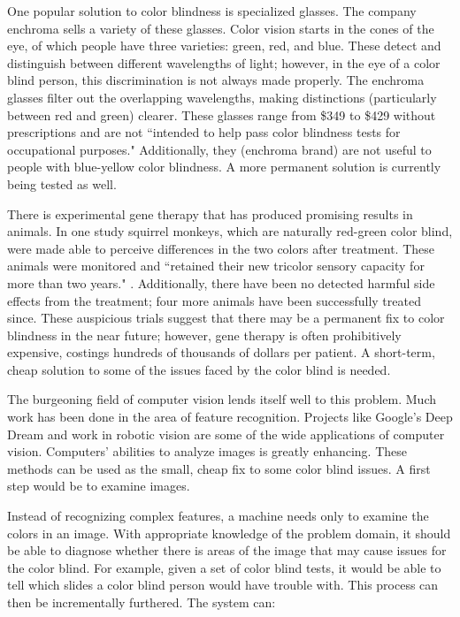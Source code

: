 \documentclass[12pt]{article}
\begin{document}
\begin{multicols}{2}
One popular solution to color blindness is specialized glasses. \cite{MITGlasses} The company enchroma sells a variety of these glasses. Color vision starts in the cones of the eye, of which people have three varieties: green, red, and blue. These detect and distinguish between different wavelengths of light; however, in the eye of a color blind person, this discrimination is not always made properly. The enchroma glasses filter out the overlapping wavelengths, making distinctions (particularly between red and green) clearer. These glasses range from \$349 to \$429 without prescriptions and are not ``intended to help pass color blindness tests for occupational purposes."\cite{enchroma} Additionally, they (enchroma brand) are not useful to people with blue-yellow color blindness. A more permanent solution is currently being tested as well.

There is experimental gene therapy that has produced promising results in animals.\cite{MITMonkey} In one study squirrel monkeys, which are naturally red-green color blind, were made able to perceive differences in the two colors after treatment. These animals were monitored and ``retained their new tricolor sensory capacity for more than two years." \cite{MITMonkey}. Additionally, there have been no detected harmful side effects from the treatment; four more animals have been successfully treated since. These auspicious trials suggest that there may be a permanent fix to color blindness in the near future; however, gene therapy is often prohibitively expensive, costings hundreds of thousands of dollars per patient. A short-term, cheap solution to some of the issues faced by the color blind is needed. 

The burgeoning field of computer vision lends itself well to this problem. Much work has been done in the area of feature recognition. Projects like Google's Deep Dream and work in robotic vision are some of the wide applications of computer vision. Computers' abilities to analyze images is greatly enhancing. These methods can be used as the small, cheap fix to some color blind issues. A first step would be to examine images.

Instead of recognizing complex features, a machine needs only to examine the colors in an image. With appropriate knowledge of the problem domain, it should be able to diagnose whether there is areas of the image that may cause issues for the color blind. For example, given a set of color blind tests, it would be able to tell which slides a color blind person would have trouble with. This process can then be incrementally furthered. The system can:



\end{multicols}
\end{document}
